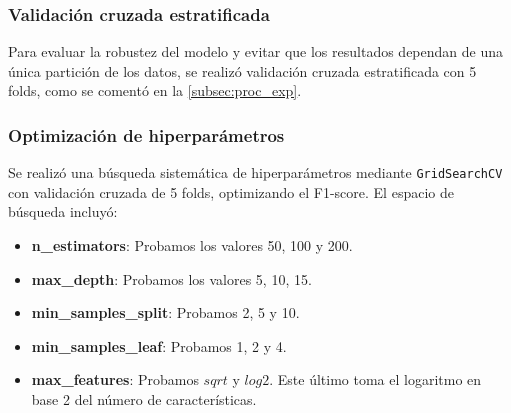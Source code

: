 \subsubsection*{Validación cruzada estratificada}

Para evaluar la robustez del modelo y evitar que los resultados dependan de una única partición de los datos, se realizó validación cruzada estratificada con 5 folds, como se comentó en la \autoref{subsec:proc_exp}.

\subsubsection*{Optimización de hiperparámetros}

Se realizó una búsqueda sistemática de hiperparámetros mediante \texttt{GridSearchCV} con validación cruzada de 5 folds, optimizando el F1-score. El espacio de búsqueda incluyó:

\begin{itemize}
	\item \textbf{n\_estimators}: Probamos los valores 50, 100 y 200.
	\item \textbf{max\_depth}: Probamos los valores 5, 10, 15.
	\item \textbf{min\_samples\_split}: Probamos 2, 5 y 10.
	\item \textbf{min\_samples\_leaf}: Probamos 1, 2 y 4.
	\item \textbf{max\_features}: Probamos $sqrt$ y $log2$. Este último toma el logaritmo en base 2 del número de características.
\end{itemize}